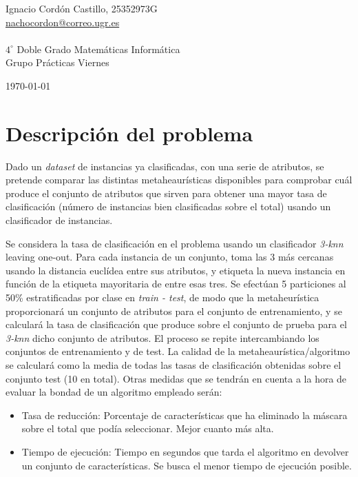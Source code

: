 \documentclass[a4paper,11pt]{article}
\newcommand{\imagent}[4]{
  \begin{wrapfigure}{#4}{0.7\textwidth}
    \begin{center}
    \texttt{[image: \#1]}
    \end{center}
    \caption{#3}
    \label{#4}
  \end{wrapfigure}
}
\newcommand{\imagen}[4]{
  \begin{minipage}{\linewidth}
    \centering
    \texttt{[image: \#1]}
    \captionof{figure}{#2}
    \label{#3}
  \end{minipage} 
}
\begin{document}
\begin{titlepage}
\begin{minipage}{\textwidth}
\begin{center} \large
Ignacio Cordón Castillo, 25352973G\\
\url{nachocordon@correo.ugr.es}\\
\ \\
$4^{\circ}$ Doble Grado Matemáticas Informática\\
Grupo Prácticas Viernes
\end{center}
\end{minipage}


\vspace{\fill}%
\large\today
\end{titlepage}  

\newpage
\tableofcontents
\newpage

\section{Descripción del problema}
Dado un \textit{dataset} de instancias ya clasificadas, con una serie de atributos, se pretende comparar las distintas 
metaheaurísticas disponibles para comprobar cuál produce el conjunto de atributos que sirven para obtener una mayor 
tasa de clasificación (número de instancias bien clasificadas sobre el total) usando un clasificador de instancias.

Se considera la tasa de clasificación en el problema usando un clasificador \textit{3-knn} leaving one-out. Para cada 
instancia de un conjunto, toma las 3 más cercanas usando la distancia euclídea entre sus atributos, y etiqueta la nueva
instancia en función de la etiqueta mayoritaria de entre esas tres. Se efectúan 5 particiones al 50\% estratificadas
por clase en \textit{train - test}, de modo que la metaheurística proporcionará un conjunto de atributos para el conjunto de
entrenamiento, y se calculará la tasa de clasificación que produce sobre el conjunto de prueba para el \textit{3-knn} dicho
conjunto de atributos. El proceso se repite intercambiando los conjuntos de entrenamiento y de test. La calidad de la 
metaheaurística/algoritmo se calculará como la media de todas las tasas de clasificación obtenidas sobre el conjunto test
(10 en total). Otras medidas que se tendrán en cuenta a la hora de evaluar la bondad de un algoritmo empleado serán:
\begin{itemize}
 \item Tasa de reducción: Porcentaje de características que ha eliminado la máscara sobre el total que podía 
 seleccionar. Mejor cuanto más alta.
 \item Tiempo de ejecución: Tiempo en segundos que tarda el algoritmo en devolver un conjunto de características.
 Se busca el menor tiempo de ejecución posible.
\end{itemize}
\end{document}

